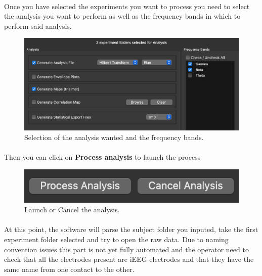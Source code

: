 \documentclass[a4paper]{article}
\begin{document}
\paragraph{} Once you have selected the experiments you want to process you need to select the analysis you want to perform as well as the frequency bands in which to perform said analysis.
\begin{figure}[H]
\begin{center}
\includegraphics[scale=0.6]{AnalysisOptions.png}
\end{center}
\caption{\label{AnalysisOptionsUI}Selection of the analysis wanted and the frequency bands.}
\end{figure}

\paragraph{} Then you can click on \textbf{Process analysis} to launch the process
\begin{figure}[H]
\begin{center}
\includegraphics[scale=0.6]{ProcessCancel.png}
\end{center}
\caption{\label{RunAnalysisFolderUI}Launch or Cancel the analysis.}
\end{figure}

\paragraph{} At this point, the software will parse the subject folder you inputed, take the first experiment folder selected and try to open the raw data. Due to naming convention issues this part is not yet fully automated and the operator need to check that all the electrodes present are iEEG electrodes and that they have the same name from one contact to the other. 
\end{document}
